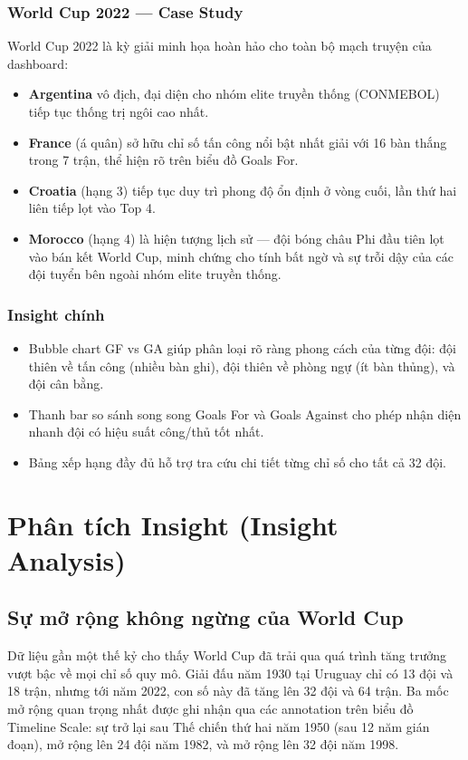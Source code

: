 \documentclass[12pt,a4paper]{article}
\begin{document}
\subsubsection{World Cup 2022 --- Case Study}
World Cup 2022 là kỳ giải minh họa hoàn hảo cho toàn bộ mạch truyện của dashboard:
\begin{itemize}
    \item \textbf{Argentina} vô địch, đại diện cho nhóm elite truyền thống (CONMEBOL) tiếp tục thống trị ngôi cao nhất.
    \item \textbf{France} (á quân) sở hữu chỉ số tấn công nổi bật nhất giải với 16 bàn thắng trong 7 trận, thể hiện rõ trên biểu đồ Goals For.
    \item \textbf{Croatia} (hạng 3) tiếp tục duy trì phong độ ổn định ở vòng cuối, lần thứ hai liên tiếp lọt vào Top 4.
    \item \textbf{Morocco} (hạng 4) là hiện tượng lịch sử --- đội bóng châu Phi đầu tiên lọt vào bán kết World Cup, minh chứng cho tính bất ngờ và sự trỗi dậy của các đội tuyển bên ngoài nhóm elite truyền thống.
\end{itemize}

\subsubsection{Insight chính}
\begin{itemize}
    \item Bubble chart GF vs GA giúp phân loại rõ ràng phong cách của từng đội: đội thiên về tấn công (nhiều bàn ghi), đội thiên về phòng ngự (ít bàn thủng), và đội cân bằng.
    \item Thanh bar so sánh song song Goals For và Goals Against cho phép nhận diện nhanh đội có hiệu suất công/thủ tốt nhất.
    \item Bảng xếp hạng đầy đủ hỗ trợ tra cứu chi tiết từng chỉ số cho tất cả 32 đội.
\end{itemize}


\newpage
\section{Phân tích Insight (Insight Analysis)}

\subsection{Sự mở rộng không ngừng của World Cup}
Dữ liệu gần một thế kỷ cho thấy World Cup đã trải qua quá trình tăng trưởng vượt bậc về mọi chỉ số quy mô. Giải đấu năm 1930 tại Uruguay chỉ có 13 đội và 18 trận, nhưng tới năm 2022, con số này đã tăng lên 32 đội và 64 trận. Ba mốc mở rộng quan trọng nhất được ghi nhận qua các annotation trên biểu đồ Timeline Scale: sự trở lại sau Thế chiến thứ hai năm 1950 (sau 12 năm gián đoạn), mở rộng lên 24 đội năm 1982, và mở rộng lên 32 đội năm 1998.
\end{document}
